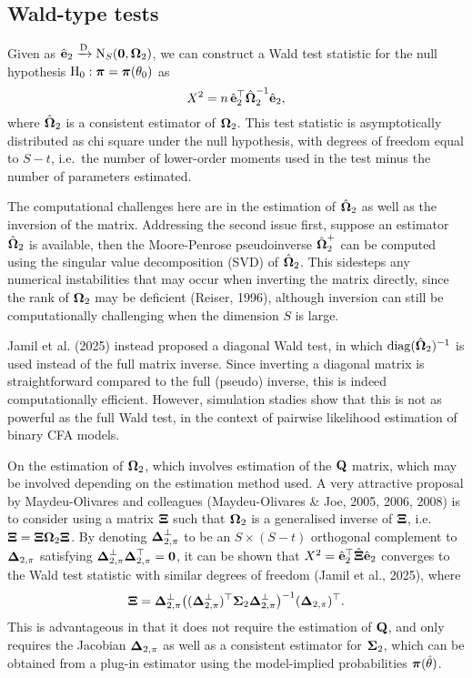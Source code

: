 \documentclass[
  letterpaper,
  DIV=11,
  numbers=noendperiod]{scrartcl}
\begin{document}
\subsection{Wald-type tests}\label{wald-type-tests}

Given as \(\hat{{\mathbf e}}_2 \xrightarrow{\text D} \operatorname{N}_S({\mathbf 0}, {\boldsymbol\Omega}_2)\), we
can construct a Wald test statistic for the null hypothesis
\(\text{H}_0: {\boldsymbol\pi} = {\boldsymbol\pi}(\theta_0)\) as \[
X^2 = n \, \hat{{\mathbf e}}_2^\top \hat{{\boldsymbol\Omega}}_2^{-1} \hat{{\mathbf e}}_2,
\] where \(\hat{{\boldsymbol\Omega}}_2\) is a consistent estimator of \({\boldsymbol\Omega}_2\).
This test statistic is asymptotically distributed as chi square under
the null hypothesis, with degrees of freedom equal to \(S-t\), i.e.~the
number of lower-order moments used in the test minus the number of
parameters estimated.

The computational challenges here are in the estimation of
\(\hat{{\boldsymbol\Omega}}_2\) as well as the inversion of the matrix. Addressing the
second issue first, suppose an estimator \(\hat{{\boldsymbol\Omega}}_2\) is available,
then the Moore-Penrose pseudoinverse \(\hat{{\boldsymbol\Omega}}_2^+\) can be computed
using the singular value decomposition (SVD) of \(\hat{{\boldsymbol\Omega}}_2\). This
sidesteps any numerical instabilities that may occur when inverting the
matrix directly, since the rank of \({\boldsymbol\Omega}_2\) may be deficient
(Reiser, 1996), although inversion can still be computationally
challenging when the dimension \(S\) is large.

Jamil et al. (2025) instead proposed a diagonal Wald test, in which
\(\operatorname{diag}(\hat{{\boldsymbol\Omega}}_2)^{-1}\) is used instead of the full matrix
inverse. Since inverting a diagonal matrix is straightforward compared
to the full (pseudo) inverse, this is indeed computationally efficient.
However, simulation stadies show that this is not as powerful as the
full Wald test, in the context of pairwise likelihood estimation of
binary CFA models.

On the estimation of \({\boldsymbol\Omega}_2\), which involves estimation of the
\({\mathbf Q}\) matrix, which may be involved depending on the estimation method
used. A very attractive proposal by Maydeu-Olivares and colleagues
(Maydeu-Olivares \& Joe, 2005, 2006, 2008) is to consider using a matrix
\({\boldsymbol\Xi}\) such that \({\boldsymbol\Omega}_2\) is a generalised inverse of \({\boldsymbol\Xi}\),
i.e.~\({\boldsymbol\Xi} = {\boldsymbol\Xi} {\boldsymbol\Omega}_2 {\boldsymbol\Xi}\). By denoting
\({\boldsymbol\Delta}_{2,\pi}^\perp\) to be an \(S\times (S-t)\) orthogonal
complement to \({\boldsymbol\Delta}_{2,\pi}\) satisfying
\({\boldsymbol\Delta}_{2,\pi}^\perp {\boldsymbol\Delta}_{2,\pi}^\top = {\mathbf 0}\), it can be shown
that \(X^2 = \hat{{\mathbf e}}_2^\top \hat{{\boldsymbol\Xi}} \hat{{\mathbf e}}_2\) converges to the Wald
test statistic with similar degrees of freedom (Jamil et al., 2025),
where \[
{\boldsymbol\Xi} = {\boldsymbol\Delta}_{2,\pi}^\perp \big( ({\boldsymbol\Delta}_{2,\pi}^\perp)^\top {\boldsymbol\Sigma}_2 {\boldsymbol\Delta}_{2,\pi}^\perp \big)^{-1} ({\boldsymbol\Delta}_{2,\pi})^\top.
\] This is advantageous in that it does not require the estimation of
\({\mathbf Q}\), and only requires the Jacobian \({\boldsymbol\Delta}_{2,\pi}\) as well as a
consistent estimator for \({\boldsymbol\Sigma}_2\), which can be obtained from a
plug-in estimator using the model-implied probabilities
\({\boldsymbol\pi}(\hat\theta)\).
\end{document}
